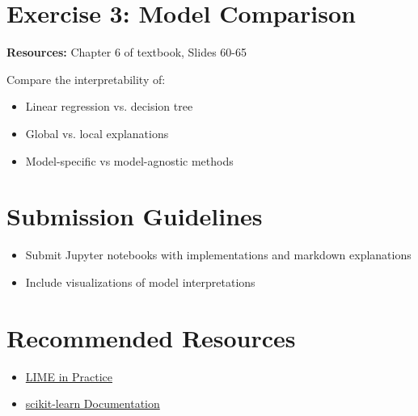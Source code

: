 \section*{Exercise 3: Model Comparison}
\textbf{Resources:} Chapter 6 of textbook, Slides 60-65

Compare the interpretability of:
\begin{itemize}
\item Linear regression vs. decision tree
\item Global vs. local explanations
\item Model-specific vs model-agnostic methods
\end{itemize}

\section*{Submission Guidelines}
\begin{itemize}
\item Submit Jupyter notebooks with implementations and markdown explanations
\item Include visualizations of model interpretations

\end{itemize}

\section*{Recommended Resources}
\begin{itemize}
\item \href{https://christophm.github.io/interpretable-ml-book/limo.html}{LIME in Practice}
\item \href{https://scikit-learn.org/stable/}{scikit-learn Documentation}
\end{itemize}

